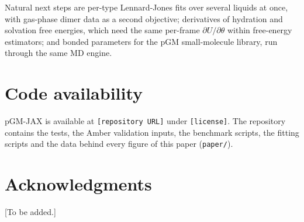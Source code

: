 \documentclass[11pt]{article}
\begin{document}
Natural next steps are per-type Lennard-Jones fits over several liquids at once, with gas-phase
dimer data as a second objective; derivatives of hydration and solvation free energies, which
need the same per-frame $\partial U/\partial\theta$ within free-energy estimators; and bonded
parameters for the pGM small-molecule library, run through the same MD engine.


\section*{Code availability}
pGM-JAX is available at \texttt{[repository URL]} under \texttt{[license]}. The repository
contains the tests, the Amber validation inputs, the benchmark scripts, the fitting scripts and
the data behind every figure of this paper (\texttt{paper/}).

\section*{Acknowledgments}
[To be added.]



\end{document}
